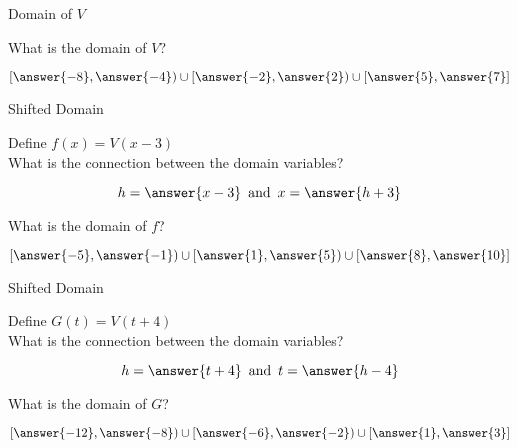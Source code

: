 \documentclass{ximera}
\begin{document}
\begin{exercise}
\begin{question} Domain of $V$


What is the domain of $V$?

\[
\left[ \answer{-8} , \answer{-4} \right)  \cup  \left[ \answer{-2} , \answer{2} \right)  \cup  \left[ \answer{5} , \answer{7} \right]
\]


\end{question}












\begin{question} Shifted Domain 

Define $f(x) = V(x - 3)$ \\


What is the connection between the domain variables? 


\[
h = \answer{x-3} \, \text{ and } \,  x = \answer{h+3}
\]

What is the domain of $f$?

\[
\left[ \answer{-5} , \answer{-1} \right)  \cup  \left[ \answer{1} , \answer{5} \right)  \cup  \left[ \answer{8} , \answer{10} \right]
\]


\end{question}















\begin{question} Shifted Domain 

Define $G(t) = V(t + 4)$ \\

What is the connection between the domain variables? 


\[
h = \answer{t+4} \, \text{ and } \,  t = \answer{h-4}
\]



What is the domain of $G$?

\[
\left[ \answer{-12} , \answer{-8} \right)  \cup  \left[ \answer{-6} , \answer{-2} \right)  \cup  \left[ \answer{1} , \answer{3} \right]
\]


\end{question}







\end{exercise}
\end{document}
